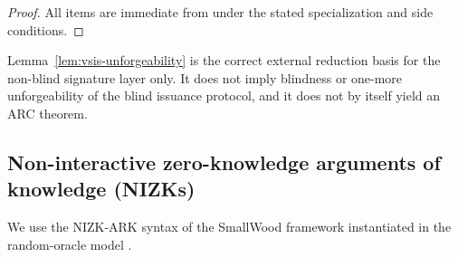 \begin{proof}
All items are immediate from \cite[Theorems~4, 5, 7, 8, and Corollary~1]{EPRINT:DKLW25} under the stated
specialization and side conditions.
\end{proof}

\begin{remark}\label{rem:vsis-unforgeability}
Lemma~\ref{lem:vsis-unforgeability} is the correct external reduction basis for the non-blind signature layer only. It
does not imply blindness or one-more unforgeability of the blind issuance protocol, and it does not by itself yield an
ARC theorem.
\end{remark}

\subsection{Non-interactive zero-knowledge arguments of knowledge (NIZKs)}
\label{subsec:prelim-nizk}
\label{subsec:nizk-ark}
We use the NIZK-ARK syntax of the SmallWood framework instantiated in the random-oracle model
\cite[Definition~3]{EPRINT:FenRiv25b}.

